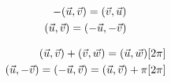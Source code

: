 \begin{multicols}{2}

\begin{eqnarray}
-(\vec{u}, \vec{v}) = (\vec{v}, \vec{u}) \\
(\vec{u}, \vec{v}) = (-\vec{u}, -\vec{v})
\end{eqnarray}


\begin{eqnarray}
(\vec{u}, \vec{v}) + (\vec{v}, \vec{w}) = (\vec{u}, \vec{w}) [2\pi]\\
(\vec{u}, -\vec{v}) = (-\vec{u}, \vec{v}) = (\vec{u}, \vec{v}) + \pi [2\pi]
\end{eqnarray}

\end{multicols}